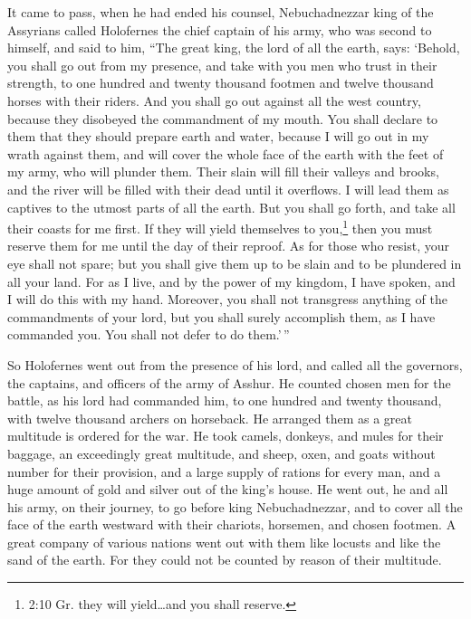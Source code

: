  It came to pass, when he had ended his counsel,
Nebuchadnezzar king of the Assyrians called Holofernes the chief captain
of his army, who was second to himself, and said to him, 
``The great king, the lord of all the earth, says: `Behold, you shall go
out from my presence, and take with you men who trust in their strength,
to one hundred and twenty thousand footmen and twelve thousand horses
with their riders.  And you shall go out against all the
west country, because they disobeyed the commandment of my mouth.
 You shall declare to them that they should prepare earth
and water, because I will go out in my wrath against them, and will
cover the whole face of the earth with the feet of my army, who will
plunder them.  Their slain will fill their valleys and
brooks, and the river will be filled with their dead until it overflows.
 I will lead them as captives to the utmost parts of all the
earth.  But you shall go forth, and take all their coasts
for me first. If they will yield themselves to you,\footnote{2:10 Gr.
  they will yield\ldots and you shall reserve.} then you must reserve
them for me until the day of their reproof.  As for those
who resist, your eye shall not spare; but you shall give them up to be
slain and to be plundered in all your land.  For as I live,
and by the power of my kingdom, I have spoken, and I will do this with
my hand.  Moreover, you shall not transgress anything of
the commandments of your lord, but you shall surely accomplish them, as
I have commanded you. You shall not defer to do them.'\,''

 So Holofernes went out from the presence of his lord, and
called all the governors, the captains, and officers of the army of
Asshur.  He counted chosen men for the battle, as his lord
had commanded him, to one hundred and twenty thousand, with twelve
thousand archers on horseback.  He arranged them as a great
multitude is ordered for the war.  He took camels, donkeys,
and mules for their baggage, an exceedingly great multitude, and sheep,
oxen, and goats without number for their provision,  and a
large supply of rations for every man, and a huge amount of gold and
silver out of the king's house.  He went out, he and all
his army, on their journey, to go before king Nebuchadnezzar, and to
cover all the face of the earth westward with their chariots, horsemen,
and chosen footmen.  A great company of various nations
went out with them like locusts and like the sand of the earth. For they
could not be counted by reason of their multitude.

